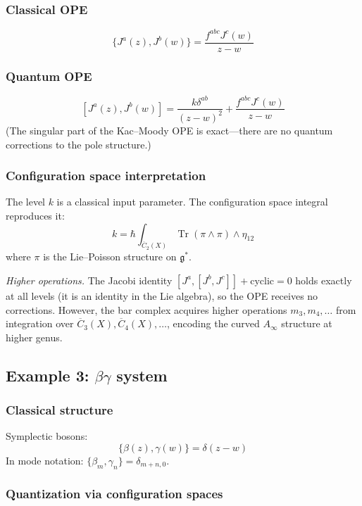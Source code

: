 \subsubsection{Classical OPE}

\[\{J^a(z), J^b(w)\} = \frac{f^{abc} J^c(w)}{z-w}\]

\subsubsection{Quantum OPE}

\[[J^a(z), J^b(w)] = \frac{k \delta^{ab}}{(z-w)^2} + \frac{f^{abc} J^c(w)}{z-w}\]
(The singular part of the Kac--Moody OPE is exact---there are no quantum corrections to the pole structure.)

\subsubsection{Configuration space interpretation}

The level $k$ is a classical input parameter. The configuration space integral reproduces it:
\[k = \hbar \int_{\overline{C}_2(X)} \operatorname{Tr}(\pi \wedge \pi) \wedge \eta_{12}\]
where $\pi$ is the Lie--Poisson structure on $\mathfrak{g}^*$.

\emph{Higher operations.}
The Jacobi identity $[J^a, [J^b, J^c]] + \text{cyclic} = 0$ holds exactly at all levels (it is an identity in the Lie algebra), so the OPE receives no corrections. However, the bar complex acquires higher operations $m_3, m_4, \ldots$ from integration over $\overline{C}_3(X), \overline{C}_4(X), \ldots$, encoding the curved $A_\infty$ structure at higher genus.

\subsection{\texorpdfstring{Example 3: $\beta\gamma$ system}{Example 3: system}}

\subsubsection{Classical structure}

Symplectic bosons:
\[\{\beta(z), \gamma(w)\} = \delta(z-w)\]
In mode notation: $\{\beta_m, \gamma_n\} = \delta_{m+n,0}$.

\subsubsection{Quantization via configuration spaces}


